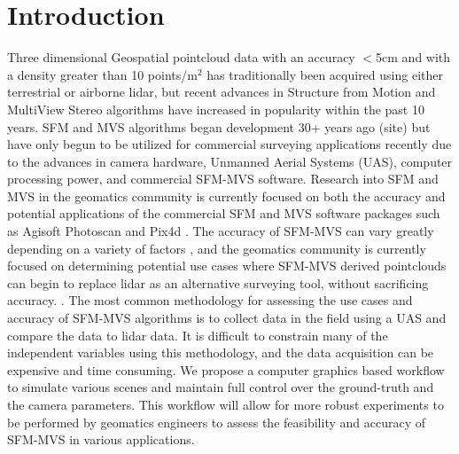 \section{Introduction}

Three dimensional Geospatial pointcloud data with an accuracy $<$5cm and with a density greater than 10 points/m$^2$ has traditionally been acquired using either terrestrial or airborne lidar, but recent advances in Structure from Motion and MultiView Stereo algorithms have increased in popularity within the past 10 years.  SFM and MVS algorithms began development 30+ years ago (site) but have only begun to be utilized for commercial surveying applications recently due to the advances in camera hardware, Unmanned Aerial Systems (UAS), computer processing power, and commercial SFM-MVS software.  Research into SFM and MVS in the geomatics community is currently focused on both the accuracy and potential applications of the commercial SFM and MVS software packages such as Agisoft Photoscan and Pix4d .  The accuracy of SFM-MVS can vary greatly depending on a variety of factors , and the geomatics community is currently focused on determining potential use cases where SFM-MVS derived pointclouds can begin to replace lidar as an alternative surveying tool, without sacrificing accuracy.  .  The most common methodology for assessing the use cases and accuracy of SFM-MVS algorithms is to collect data in the field using a UAS and compare the data to lidar data.  It is difficult to constrain many of the independent variables using this methodology, and the data acquisition can be expensive and time consuming.  We propose a computer graphics based workflow to simulate various scenes and maintain full control over the ground-truth and the camera parameters.  This workflow will allow for more robust experiments to be performed by geomatics engineers to assess the feasibility and accuracy of SFM-MVS in various applications.

